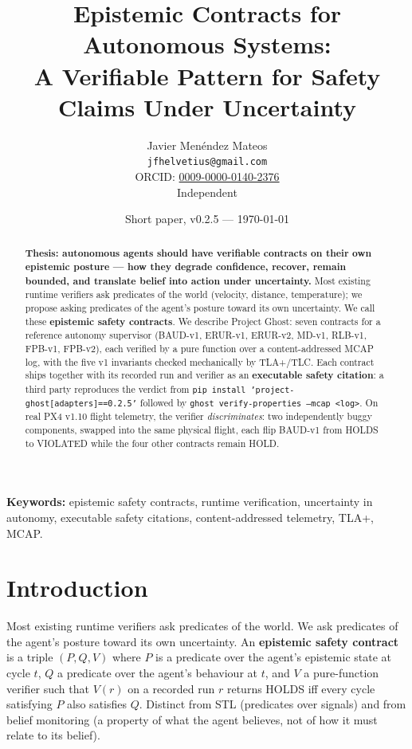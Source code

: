 \documentclass[11pt,a4paper]{article}
\title{Epistemic Contracts for Autonomous Systems:\\
       A Verifiable Pattern for Safety Claims Under Uncertainty}
\author{Javier Menéndez Mateos\\
        \texttt{jfhelvetius@gmail.com}\\
        \small ORCID: \href{https://orcid.org/0009-0000-0140-2376}{0009-0000-0140-2376}\\
        \small Independent}
\date{Short paper, v0.2.5 --- \today}
\begin{document}
\maketitle

\begin{abstract}
\textbf{Thesis: autonomous agents should have verifiable contracts
on their own epistemic posture --- how they degrade confidence,
recover, remain bounded, and translate belief into action under
uncertainty.} Most existing runtime verifiers ask predicates of
the world (velocity, distance, temperature); we propose asking
predicates of the agent's posture toward its own uncertainty. We
call these \textbf{epistemic safety contracts}. We describe
Project Ghost: seven contracts for a reference autonomy supervisor
(BAUD-v1, ERUR-v1, ERUR-v2, MD-v1, RLB-v1, FPB-v1, FPB-v2), each
verified by a pure function over a content-addressed MCAP log, with
the five v1 invariants checked mechanically by TLA+/TLC. Each
contract ships together with its recorded run and verifier as an
\textbf{executable safety citation}: a third party reproduces the
verdict from
\texttt{pip install 'project-ghost[adapters]==0.2.5'} followed by
\texttt{ghost verify-properties --mcap <log>}. On real PX4 v1.10
flight telemetry, the verifier \emph{discriminates}: two
independently buggy components, swapped into the same physical
flight, each flip BAUD-v1 from HOLDS to VIOLATED while the four
other contracts remain HOLD.
\end{abstract}

\noindent\textbf{Keywords:} epistemic safety contracts, runtime
verification, uncertainty in autonomy, executable safety
citations, content-addressed telemetry, TLA+, MCAP.

\section{Introduction}
\label{sec:intro}

Most existing runtime verifiers ask predicates of the world.
We ask predicates of the agent's posture toward its own
uncertainty. An \textbf{epistemic safety contract} is a triple
$(P,Q,V)$ where $P$ is a predicate over the agent's epistemic
state at cycle $t$, $Q$ a predicate over the agent's behaviour at
$t$, and $V$ a pure-function verifier such that $V(r)$ on a
recorded run $r$ returns HOLDS iff every cycle satisfying $P$
also satisfies $Q$. Distinct from STL (predicates over signals)
and from belief monitoring (a property of what the agent
believes, not of how it must relate to its belief).
\end{document}
